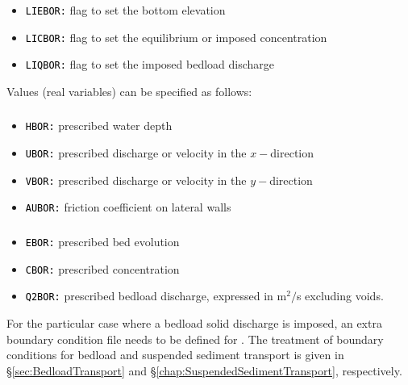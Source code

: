 \subsubsection{\gaia{}}
\begin{itemize}
\item \texttt{\textcolor{black}{LIEBOR:}} flag to set the bottom elevation
\item \texttt{\textcolor{black}{LICBOR:}} flag to set the equilibrium or imposed concentration
  \item \texttt{\textcolor{black}{LIQBOR:}} flag to set the imposed bedload discharge
\end{itemize}

Values (real variables) can be specified as follows:
\subsubsection{}
\begin{itemize}
\item \texttt{\textcolor{black}{HBOR:}} prescribed water depth
\item \texttt{\textcolor{black}{UBOR:}} prescribed discharge or velocity in the $x-$direction
\item \texttt{\textcolor{black}{VBOR:}} prescribed discharge or velocity in the $y-$direction
\item \texttt{\textcolor{black}{AUBOR:}} friction coefficient on lateral walls
\end{itemize}
\subsubsection{\gaia{}}
\begin{itemize}
\item \texttt{\textcolor{black}{EBOR:}} prescribed bed evolution
\item \texttt{\textcolor{black}{CBOR:}} prescribed concentration
\item \texttt{\textcolor{black}{Q2BOR:}} prescribed bedload discharge, expressed in m$^2/$s excluding voids.
\end{itemize}

For the particular case where a bedload solid discharge is imposed, an extra boundary condition file needs to be defined for \gaia{}. The treatment of boundary conditions for bedload and suspended sediment transport is given in \S\ref{sec:BedloadTransport} and \S\ref{chap:SuspendedSedimentTransport}, respectively.

